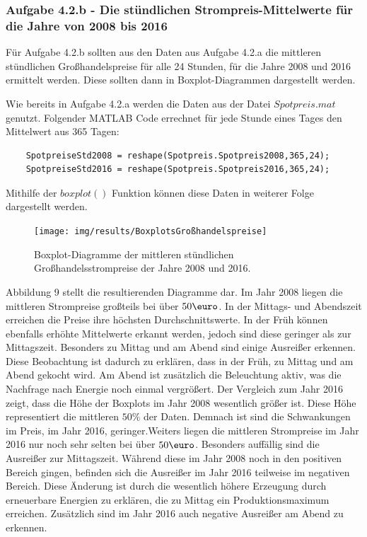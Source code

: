 \documentclass[a4paper,12pt]{article}
\begin{document}
	\subsubsection{Aufgabe 4.2.b - Die stündlichen Strompreis-Mittelwerte für die Jahre von 2008 bis 2016}
	Für Aufgabe 4.2.b sollten aus den Daten aus Aufgabe 4.2.a die mittleren stündlichen Großhandelspreise für alle 24 Stunden, für die Jahre 2008 und 2016 ermittelt werden. Diese sollten dann in Boxplot-Diagrammen dargestellt werden.\\ \par
	\noindent Wie bereits in Aufgabe 4.2.a werden die Daten aus der Datei $Spotpreis.mat$ genutzt.\newline
	Folgender MATLAB Code errechnet für jede Stunde eines Tages den Mittelwert aus 365 Tagen:
	\begin{lstlisting}
	SpotpreiseStd2008 = reshape(Spotpreis.Spotpreis2008,365,24);
	SpotpreiseStd2016 = reshape(Spotpreis.Spotpreis2016,365,24);
	\end{lstlisting}
	Mithilfe der $boxplot()$ Funktion können diese Daten in weiterer Folge dargestellt werden.
	\begin{figure}[H]
		\centering
		\texttt{[image: img/results/BoxplotsGroßhandelspreise]}
		\caption{Boxplot-Diagramme der mittleren stündlichen Großhandelsstrompreise der Jahre 2008 und 2016.}
	\end{figure}
	\noindent Abbildung 9 stellt die resultierenden Diagramme dar.\newline
	Im Jahr 2008 liegen die mittleren Strompreise großteils bei über $50\mbox{\euro}$. In der Mittags- und Abendszeit erreichen die Preise ihre höchsten Durchschnittswerte. In der Früh können ebenfalls erhöhte Mittelwerte erkannt werden, jedoch sind diese geringer als zur Mittagszeit. Besonders zu Mittag und am Abend sind einige Ausreißer erkennen.\newline
	Diese Beobachtung ist dadurch zu erklären, dass in der Früh, zu Mittag und am Abend gekocht wird. Am Abend ist zusätzlich die Beleuchtung aktiv, was die Nachfrage nach Energie noch einmal vergrößert.\newline
	\noindent Der Vergleich zum Jahr 2016 zeigt, dass die Höhe der Boxplots im Jahr 2008 wesentlich größer ist. Diese Höhe representiert die mittleren $50\%$ der Daten. Demnach ist sind die Schwankungen im Preis, im Jahr 2016, geringer.\newline Weiters liegen die mittleren Strompreise im Jahr 2016 nur noch sehr selten bei über $50\mbox{\euro}$.\newline
	Besonders auffällig sind die Ausreißer zur Mittagszeit. Während diese im Jahr 2008 noch in den positiven Bereich gingen, befinden sich die Ausreißer im Jahr 2016 teilweise im negativen Bereich. Diese Änderung ist durch die wesentlich höhere Erzeugung durch erneuerbare Energien zu erklären, die zu Mittag ein Produktionsmaximum erreichen. Zusätzlich sind im Jahr 2016 auch negative Ausreißer am Abend zu erkennen.
\end{document}
